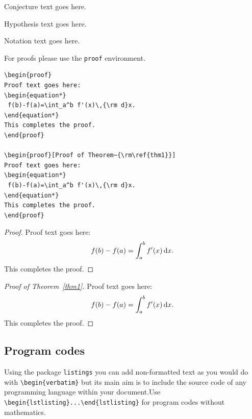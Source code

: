 \documentclass[11pt]{article}
\begin{document}
\begin{conjecture}
Conjecture text goes here.
\end{conjecture}

\begin{hypothesis}
Hypothesis text goes here.
\end{hypothesis}

\begin{notation}
Notation text goes here.
\end{notation}


\noindent For proofs please use the \texttt{proof} environment.
\begin{verbatim}
\begin{proof}
Proof text goes here:
\begin{equation*}
 f(b)-f(a)=\int_a^b f'(x)\,{\rm d}x.
\end{equation*}
This completes the proof.
\end{proof}

\begin{proof}[Proof of Theorem~{\rm\ref{thm1}}]
Proof text goes here:
\begin{equation*}
 f(b)-f(a)=\int_a^b f'(x)\,{\rm d}x.
\end{equation*}
This completes the proof.
\end{proof}
\end{verbatim}

\begin{proof}
Proof text goes here:
\begin{equation*}
 f(b)-f(a)=\int_a^b f'(x)\,{\rm d}x.
\end{equation*}
This completes the proof.
\end{proof}

\begin{proof}[Proof of Theorem~{\rm\ref{thm1}}]
Proof text goes here:
\begin{equation*}
 f(b)-f(a)=\int_a^b f'(x)\,{\rm d}x.
\end{equation*}
This completes the proof.
\end{proof}



\subsection{Program codes}

Using the package {\tt listings} you can add non-formatted text as you would do with \verb|\begin{verbatim}| but its main aim is to include the source code of any programming language within your document.\newline Use \verb|\begin{lstlisting}...\end{lstlisting}| for program codes without mathematics.
\end{document}

